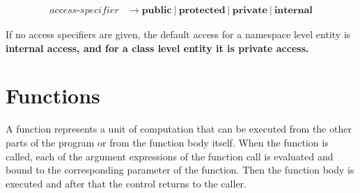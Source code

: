 \documentclass[a4paper,oneside,11pt]{article}
\begin{document}
\begin{align*}
access\textrm{-}specifier &\rightarrow \textbf{public} \> | \> \textbf{protected} \> | \> \textbf{private} \> | \> \textbf{internal}
\end{align*}

If no access specifiers are given, the default access for a namespace level entity is \bf{internal} access, and for a class level entity it is \bf{private} access.

\section{Functions}\label{functiondefinition}\label{templateparameterlist}\label{parameters}\label{parameterlist}\label{functionbody}\label{functionname}

A function represents a unit of computation that can be executed from the other parts of the program or from the function body itself.
When the function is called, each of the argument expressions of the function call is evaluated and bound to the corresponding parameter of the function.
Then the function body is executed and after that the control returns to the caller.
\end{document}
